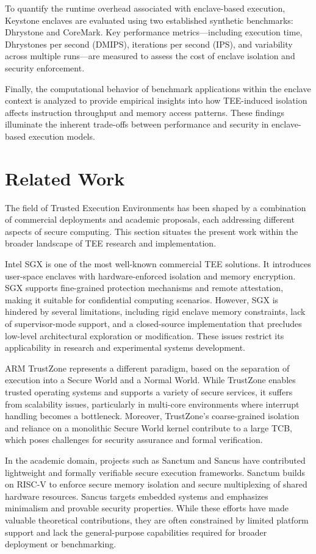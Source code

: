 To quantify the runtime overhead associated with enclave-based execution, Keystone enclaves are evaluated using two established synthetic benchmarks: Dhrystone and CoreMark. Key performance metrics—including execution time, Dhrystones per second (DMIPS), iterations per second (IPS), and variability across multiple runs—are measured to assess the cost of enclave isolation and security enforcement.

Finally, the computational behavior of benchmark applications within the enclave context is analyzed to provide empirical insights into how TEE-induced isolation affects instruction throughput and memory access patterns. These findings illuminate the inherent trade-offs between performance and security in enclave-based execution models.

\section{Related Work}

The field of Trusted Execution Environments has been shaped by a combination of commercial deployments and academic proposals, each addressing different aspects of secure computing. This section situates the present work within the broader landscape of TEE research and implementation.

Intel SGX is one of the most well-known commercial TEE solutions. It introduces user-space enclaves with hardware-enforced isolation and memory encryption. SGX supports fine-grained protection mechanisms and remote attestation, making it suitable for confidential computing scenarios. However, SGX is hindered by several limitations, including rigid enclave memory constraints, lack of supervisor-mode support, and a closed-source implementation that precludes low-level architectural exploration or modification. These issues restrict its applicability in research and experimental systems development.

ARM TrustZone represents a different paradigm, based on the separation of execution into a Secure World and a Normal World. While TrustZone enables trusted operating systems and supports a variety of secure services, it suffers from scalability issues, particularly in multi-core environments where interrupt handling becomes a bottleneck. Moreover, TrustZone's coarse-grained isolation and reliance on a monolithic Secure World kernel contribute to a large TCB, which poses challenges for security assurance and formal verification.

In the academic domain, projects such as Sanctum and Sancus have contributed lightweight and formally verifiable secure execution frameworks. Sanctum builds on RISC-V to enforce secure memory isolation and secure multiplexing of shared hardware resources. Sancus targets embedded systems and emphasizes minimalism and provable security properties. While these efforts have made valuable theoretical contributions, they are often constrained by limited platform support and lack the general-purpose capabilities required for broader deployment or benchmarking.


